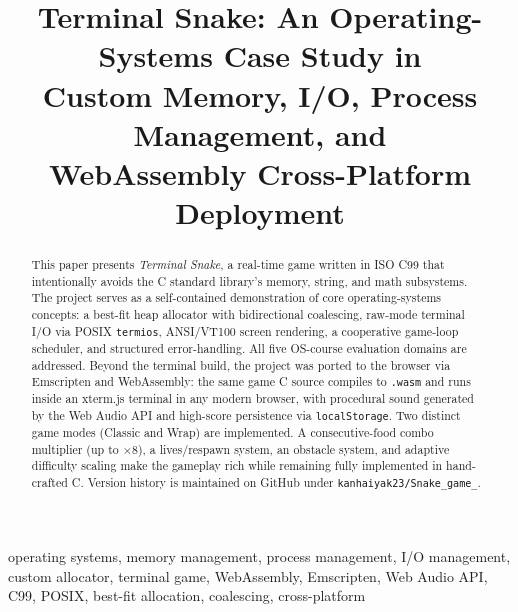 \documentclass[conference]{IEEEtran}
\begin{document}
\title{Terminal Snake: An Operating-Systems Case Study in\\
Custom Memory, I/O, Process Management, and\\
WebAssembly Cross-Platform Deployment}

\author{
  \and
}

\maketitle

\begin{abstract}
This paper presents \textit{Terminal Snake}, a real-time game written in ISO
C99 that intentionally avoids the C standard library's memory, string, and
math subsystems. The project serves as a self-contained demonstration of core
operating-systems concepts: a best-fit heap allocator with bidirectional
coalescing, raw-mode terminal I/O via POSIX \texttt{termios}, ANSI/VT100
screen rendering, a cooperative game-loop scheduler, and structured
error-handling. All five OS-course evaluation domains are addressed. Beyond the
terminal build, the project was ported to the browser via Emscripten and
WebAssembly: the same game C source compiles to \texttt{.wasm} and runs inside
an xterm.js terminal in any modern browser, with procedural sound generated by
the Web Audio API and high-score persistence via \texttt{localStorage}. Two
distinct game modes (Classic and Wrap) are implemented. A consecutive-food
combo multiplier (up to $\times$8), a lives/respawn system, an obstacle
system, and adaptive difficulty scaling make the gameplay rich while remaining
fully implemented in hand-crafted C. Version history is maintained on GitHub
under \texttt{kanhaiyak23/Snake\_game\_}.
\end{abstract}

\begin{IEEEkeywords}
operating systems, memory management, process management, I/O management,
custom allocator, terminal game, WebAssembly, Emscripten, Web Audio API,
C99, POSIX, best-fit allocation, coalescing, cross-platform
\end{IEEEkeywords}
\end{document}
